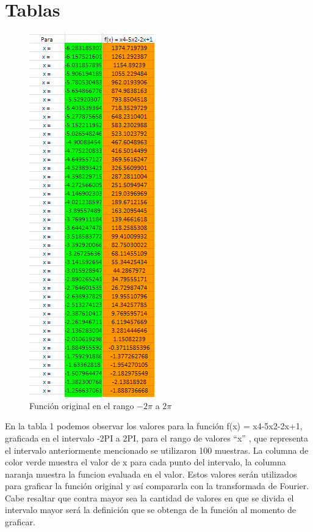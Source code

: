 
\section{Tablas}

\begin{figure}[H]
    \centering
    \includegraphics[width=2.13542in,height=6.19792in]{media/image23.png}    
    \caption{Función original en el rango \(-2\pi\) a \(2\pi\)}
\end{figure}

En la tabla 1 podemos observar los valores para la función f(x) = x4-5x2-2x+1, graficada en el intervalo -2PI a 2PI, para el rango de valores ``x'' , que representa el intervalo anteriormente mencionado se utilizaron 100 muestras. La columna de color verde muestra el valor de x para cada punto del intervalo, la columna naranja muestra la funcion evaluada en el valor. Estos valores serán utilizados para graficar la función original y así compararla con la transformada de Fourier. Cabe resaltar que contra mayor sea la cantidad de valores en que se divida el intervalo mayor será la definición que se obtenga de la función al momento de graficar.

